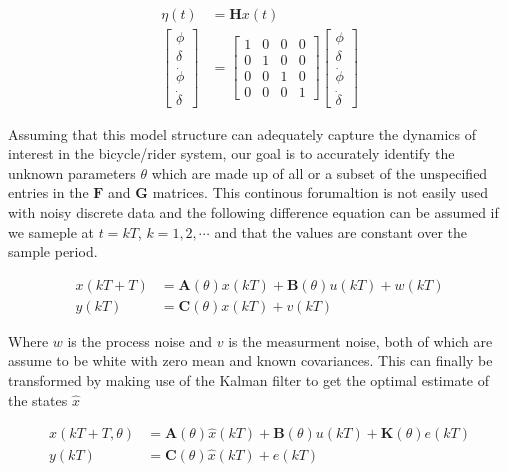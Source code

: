 \documentclass[twocolumn,10pt]{asme2e}
\begin{document}
\begin{equation}
	\begin{split}
		\eta(t) & = \mathbf{H}x(t)\\
		\begin{bmatrix}
			\phi \\
			\delta \\
			\dot{\phi} \\
			\dot{\delta}
		\end{bmatrix}
		& =
		\begin{bmatrix}
			1 & 0 & 0 & 0 \\
			0 & 1 & 0 & 0 \\
			0 & 0 & 1 & 0 \\
			0 & 0 & 0 & 1
		\end{bmatrix}
		\begin{bmatrix}
			\phi \\
			\delta \\
			\dot{\phi} \\
			\dot{\delta}
		\end{bmatrix}
	\end{split}
\end{equation}

Assuming that this model structure can adequately capture the dynamics of
interest in the bicycle/rider system, our goal is to accurately identify the
unknown parameters $\theta$ which are made up of all or a subset of the
unspecified entries in the $\mathbf{F}$ and $\mathbf{G}$ matrices. This
continous forumaltion is not easily used with noisy discrete data and the
following difference equation can be assumed if we sameple at $t=kT$,
$k=1,2,\cdots$ and that the values are constant over the sample period.

\begin{equation}
	\begin{split}
		x(kT + T) & = \mathbf{A}(\theta)x(kT) + \mathbf{B}(\theta)u(kT) + w(kT)\\
		y(kT) & = \mathbf{C}(\theta)x(kT) + v(kT)
	\end{split}
\end{equation}

Where $w$ is the process noise and $v$ is the measurment noise, both of which
are assume to be white with zero mean and known covariances. This can finally
be transformed by making use of the Kalman filter to get the optimal estimate
of the states $\hat{x}$

\begin{equation}
	\begin{split}
		\hat{x}(kT + T, \theta) & = \mathbf{A}(\theta)\hat{x}(kT) +
			\mathbf{B}(\theta)u(kT) + \mathbf{K}(\theta)e(kT)\\
		y(kT) & = \mathbf{C}(\theta)\hat{x}(kT) + e(kT)
	\end{split}
\end{equation}
\end{document}
